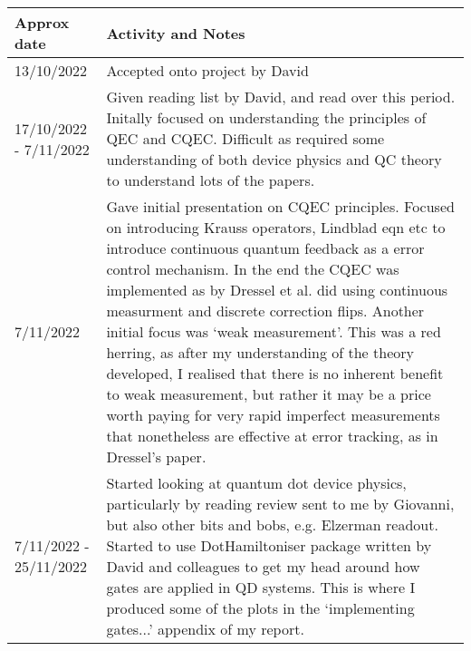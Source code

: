 \documentclass{article}
\begin{document}
\begin{table}
\centering
\begin{tabular}{|p{2cm}|p{10cm}|}
    \hline
    Approx date & Activity and Notes \\
    \hline\hline  13/10/2022 & Accepted onto project by David\\
    \hline 17/10/2022 - 7/11/2022 & Given reading list by David, and read over this period. Initally focused on understanding the principles of QEC and CQEC. Difficult as required some understanding of both device physics and QC theory to understand lots of the papers. \\
    \hline 7/11/2022 & Gave initial presentation on CQEC principles. Focused on introducing Krauss operators, Lindblad eqn etc to introduce continuous quantum feedback as a error control mechanism. In the end the CQEC was implemented as by Dressel et al. did using continuous measurment and discrete correction flips. Another initial focus was `weak measurement'. This was a red herring, as after my understanding of the theory developed, I realised that there is no inherent benefit to weak measurement, but rather it may be a price worth paying for very rapid imperfect measurements that nonetheless are effective at error tracking, as in Dressel's paper.\\
    \hline 7/11/2022 - 25/11/2022 & Started looking at quantum dot device physics, particularly by reading review sent to me by Giovanni, but also other bits and bobs, e.g. Elzerman readout. Started to use DotHamiltoniser package written by David and colleagues to get my head around how gates are applied in QD systems. This is where I produced some of the plots in the `implementing gates...' appendix of my report.\\
    

\end{tabular}
\end{table}
\end{document}
